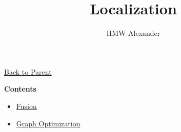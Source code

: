 \documentclass[letterpaper,11pt]{article}
\title{\textbf{Localization}}
\author{HMW-Alexander}
\begin{document}
\maketitle

\href{../index.html}{Back to Parent}

\textbf{Contents}
\begin{itemize}
	\item \href{./Fusion/index.html}{Fusion}
	\item \href{./Graph_Optimization/index.html}{Graph Optimization}
\end{itemize}
	
\end{document}
